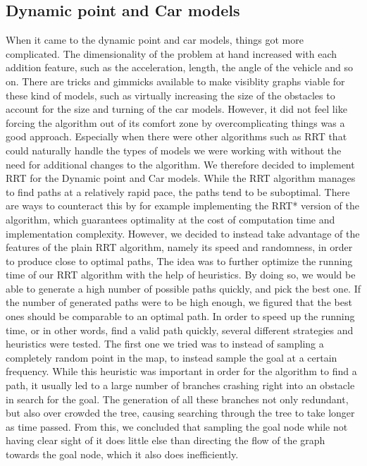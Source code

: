 \documentclass[a4paper,12pt]{article}
\begin{document}
\subsection{Dynamic point and Car models}
\label{sec:dpm}
When it came to the dynamic point and car models, things got more complicated. The dimensionality of the problem at hand increased with each addition feature, such as the acceleration, length, the angle of the vehicle and so on. 
There are tricks and gimmicks available to make visiblity graphs viable for these kind of models, such as virtually increasing the size of the obstacles to account for the size and turning of the car models. However, it did not feel like forcing the algorithm out of its comfort zone by overcomplicating things was a good approach. Especially when there were other algorithms such as RRT that could naturally handle the types of models we were working with without the need for additional changes to the algorithm. We therefore decided to implement RRT for the Dynamic point and Car models.
While the RRT algorithm manages to find paths at a relatively rapid pace, the paths tend to be suboptimal. There are ways to counteract this by for example implementing the RRT* version of the algorithm, which guarantees optimality at the cost of computation time and implementation complexity. However, we decided to instead take advantage of the features of the plain RRT algorithm, namely its speed and randomness, in order to produce close to optimal paths,
The idea was to further optimize the running time of our RRT algorithm with the help of heuristics. By doing so, we would be able to generate a high number of possible paths quickly, and pick the best one. If the number of generated paths were to be high enough, we figured that the best ones should be comparable to an optimal path.
In order to speed up the running time, or in other words, find a valid path quickly, several different strategies and heuristics were tested.  
The first one we tried was to instead of sampling a completely random point in the map, to instead sample the goal at a certain frequency. While this heuristic was important in order for the algorithm to find a path, it usually led to a large number of branches crashing right into an obstacle in search for the goal. The generation of all these branches not only redundant, but also over crowded the tree, causing searching through the tree to take longer as time passed.
From this, we concluded that sampling the goal node while not having clear sight of it does little else than directing the flow of the graph towards the goal node, which it also does inefficiently. 
\end{document}
